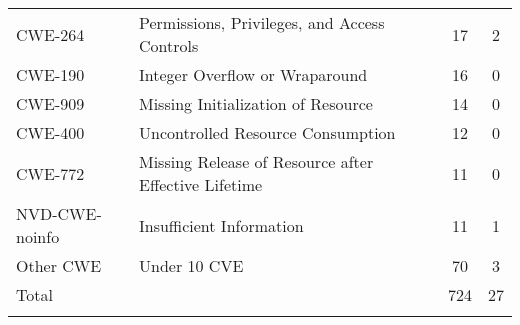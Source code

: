 \begin{table}[t]
{\begin{tabular}{llcc}
      CWE-264 	&Permissions, Privileges, and Access Controls	&17	&2\\
      CWE-190 	&Integer Overflow or Wraparound	&16	&0\\
      CWE-909 	&Missing Initialization of Resource	&14	&0\\
      CWE-400 	&Uncontrolled Resource Consumption	&12	&0\\
      CWE-772 	&Missing Release of Resource after Effective Lifetime	&11	&0\\
      NVD-CWE-noinfo 	&Insufficient Information	&11	&1\\
      \hline \noalign{\smallskip}
      Other CWE & Under 10 CVE & 70&3\\
      \hline \noalign{\smallskip}
      Total & & 724 & 27\\
      \hline \noalign{\smallskip}

    \end{tabular}
  }
    \label{tb:kernel_vulnerability_cwe_list}
  \end{table}
  
